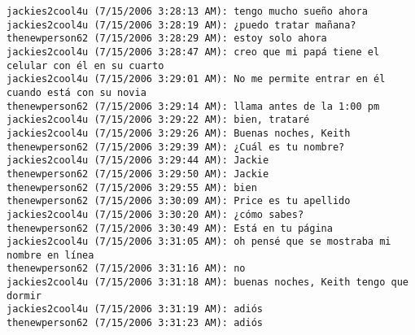 \begin{verbatim}
jackies2cool4u (7/15/2006 3:28:13 AM): tengo mucho sueño ahora
jackies2cool4u (7/15/2006 3:28:19 AM): ¿puedo tratar mañana?
thenewperson62 (7/15/2006 3:28:29 AM): estoy solo ahora
jackies2cool4u (7/15/2006 3:28:47 AM): creo que mi papá tiene el celular con él en su cuarto
jackies2cool4u (7/15/2006 3:29:01 AM): No me permite entrar en él cuando está con su novia
thenewperson62 (7/15/2006 3:29:14 AM): llama antes de la 1:00 pm
jackies2cool4u (7/15/2006 3:29:22 AM): bien, trataré
jackies2cool4u (7/15/2006 3:29:26 AM): Buenas noches, Keith
thenewperson62 (7/15/2006 3:29:39 AM): ¿Cuál es tu nombre?
jackies2cool4u (7/15/2006 3:29:44 AM): Jackie
thenewperson62 (7/15/2006 3:29:50 AM): Jackie
thenewperson62 (7/15/2006 3:29:55 AM): bien
thenewperson62 (7/15/2006 3:30:09 AM): Price es tu apellido
jackies2cool4u (7/15/2006 3:30:20 AM): ¿cómo sabes?
thenewperson62 (7/15/2006 3:30:49 AM): Está en tu página
jackies2cool4u (7/15/2006 3:31:05 AM): oh pensé que se mostraba mi nombre en línea
thenewperson62 (7/15/2006 3:31:16 AM): no
jackies2cool4u (7/15/2006 3:31:18 AM): buenas noches, Keith tengo que dormir
jackies2cool4u (7/15/2006 3:31:19 AM): adiós
thenewperson62 (7/15/2006 3:31:23 AM): adiós
\end{verbatim}





